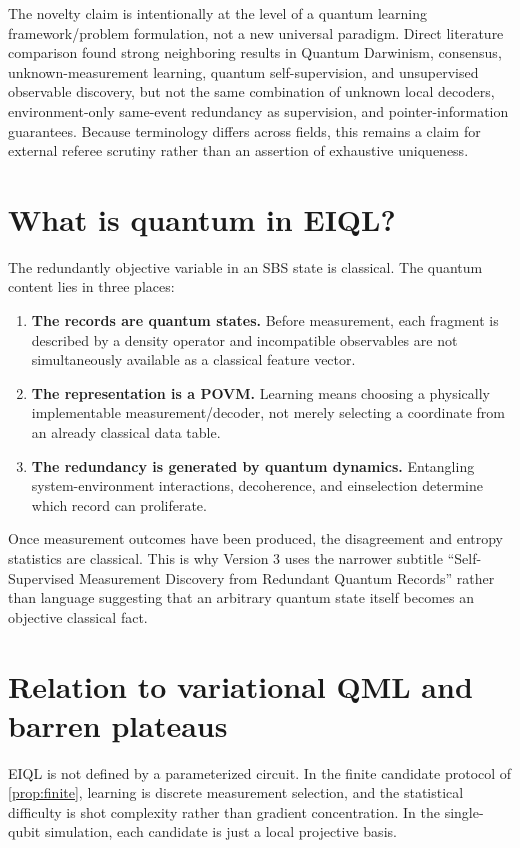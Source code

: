 The novelty claim is intentionally at the level of a quantum learning framework/problem formulation, not a new universal paradigm. Direct literature comparison found strong neighboring results in Quantum Darwinism, consensus, unknown-measurement learning, quantum self-supervision, and unsupervised observable discovery, but not the same combination of unknown local decoders, environment-only same-event redundancy as supervision, and pointer-information guarantees. Because terminology differs across fields, this remains a claim for external referee scrutiny rather than an assertion of exhaustive uniqueness.

\section{What is quantum in EIQL?}

The redundantly objective variable in an SBS state is classical. The quantum content lies in three places:

\begin{enumerate}
\item \textbf{The records are quantum states.} Before measurement, each fragment is described by a density operator and incompatible observables are not simultaneously available as a classical feature vector.
\item \textbf{The representation is a POVM.} Learning means choosing a physically implementable measurement/decoder, not merely selecting a coordinate from an already classical data table.
\item \textbf{The redundancy is generated by quantum dynamics.} Entangling system-environment interactions, decoherence, and einselection determine which record can proliferate.
\end{enumerate}

Once measurement outcomes have been produced, the disagreement and entropy statistics are classical. This is why Version 3 uses the narrower subtitle ``Self-Supervised Measurement Discovery from Redundant Quantum Records'' rather than language suggesting that an arbitrary quantum state itself becomes an objective classical fact.

\section{Relation to variational QML and barren plateaus}

EIQL is not defined by a parameterized circuit. In the finite candidate protocol of \cref{prop:finite}, learning is discrete measurement selection, and the statistical difficulty is shot complexity rather than gradient concentration. In the single-qubit simulation, each candidate is just a local projective basis.

